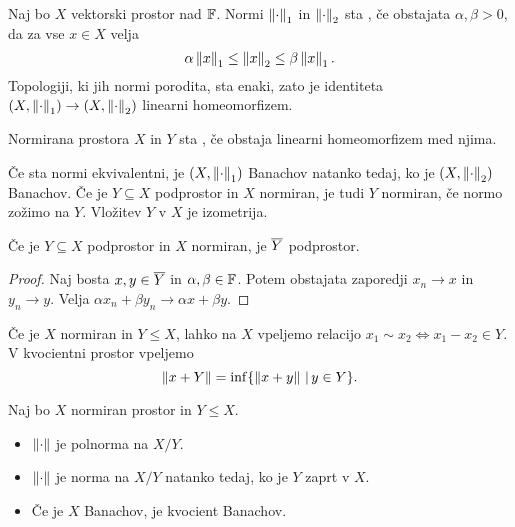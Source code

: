 
Naj bo $X$ vektorski prostor nad $\mathbb{F}$.
Normi $\left\lVert\cdot\right\rVert_1$ in $\left\lVert\cdot\right\rVert_2$ sta , če
obstajata $\alpha, \beta > 0$, da za vse $x \in X$ velja
\[
  \alpha \left\lVert x\right\rVert_1 \le \left\lVert x\right\rVert_2 \le \beta \left\lVert x\right\rVert_1.
\]
Topologiji, ki jih normi porodita, sta enaki, zato je identiteta $(X,
\left\lVert\cdot\right\rVert_1) \to (X, \left\lVert\cdot\right\rVert_2)$ linearni homeomorfizem.

\begin{definicija}
  Normirana prostora $X$ in $Y$ sta , če obstaja linearni
  homeomorfizem med njima.
\end{definicija}


Če sta normi ekvivalentni, je $(X, \left\lVert\cdot\right\rVert_1)$ Banachov natanko tedaj, ko
je $(X, \left\lVert\cdot\right\rVert_2)$ Banachov.
Če je $Y \subseteq X$ podprostor in $X$ normiran, je tudi $Y$ normiran, če normo
zožimo na $Y$.
Vložitev $Y$ v $X$ je izometrija.

\begin{lema}
  Če je $Y \subseteq X$ podprostor in $X$ normiran, je $\overline{Y}$ podprostor.
\end{lema}

\begin{proof}
  Naj bosta $x, y \in \overline{Y}$ in $\alpha, \beta \in \mathbb{F}$.
  Potem obstajata zaporedji $x_n \to x$ in $y_n \to y$.
  Velja $\alpha x_n + \beta y_n \to \alpha x + \beta y$.
\end{proof}

Če je $X$ normiran in $Y \le X$, lahko na $X$ vpeljemo relacijo $x_1 \sim x_2
\iff x_1 - x_2 \in Y$.
V kvocientni prostor vpeljemo
\[
  \left\lVert x + Y\right\rVert = \inf \{ \left\lVert x+y\right\rVert \,|\, y \in Y \}.
\]

\begin{trditev}
  Naj bo $X$ normiran prostor in $Y \le X$.
  \begin{itemize}
  \item $\left\lVert\cdot\right\rVert$ je polnorma na $X/Y$.
  \item $\left\lVert\cdot\right\rVert$ je norma na $X/Y$ natanko tedaj, ko je $Y$ zaprt v $X$.
  \item Če je $X$ Banachov, je kvocient Banachov.
  \end{itemize}
\end{trditev}

